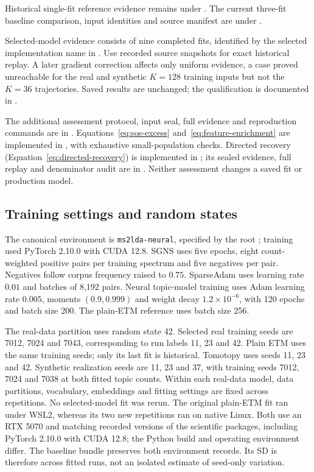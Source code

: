 \documentclass[10pt,a4paper]{article}
\begin{document}
Historical single-fit reference evidence remains under
.
The current three-fit baseline comparison, input identities and source
manifest are under .

Selected-model evidence consists of nine completed fits, identified by the
selected implementation name in
.
Use recorded source snapshots for exact historical replay. A later gradient
correction affects only uniform evidence, a case proved unreachable for the
real and synthetic $K=128$ training inputs but not the $K=36$ trajectories.
Saved results are unchanged; the qualification is documented in
.

The additional assessment protocol, input seal, full evidence and reproduction
commands are in .
Equations~\ref{eq:sos-excess} and~\ref{eq:feature-enrichment} are implemented
in , with exhaustive
small-population checks.
Directed recovery (Equation~\ref{eq:directed-recovery}) is implemented in
; its sealed evidence,
full replay and denominator audit are in
. Neither assessment changes
a saved fit or production model.

\subsection{Training settings and random states}
\label{app:recipe}
The canonical environment is \texttt{ms2lda-neural}, specified by the root
; training used PyTorch 2.10.0 with CUDA 12.8.
SGNS uses five epochs, eight count-weighted positive pairs per training
spectrum and five negatives per pair. Negatives follow corpus frequency
raised to $0.75$. SparseAdam uses learning rate $0.01$ and batches of 8,192
pairs. Neural topic-model training uses Adam learning rate $0.005$, moments
$(0.9,0.999)$ and weight decay $1.2\times10^{-6}$, with 120 epochs and batch
size 200. The plain-ETM reference uses batch size 256.

The real-data partition uses random state 42. Selected real training seeds
are 7012, 7024 and 7043, corresponding to run labels 11, 23 and 42.
Plain ETM uses the same training seeds; only its last fit is historical.
Tomotopy uses seeds 11, 23 and 42. Synthetic realization seeds are 11, 23
and 37, with training seeds 7012, 7024 and 7038 at both fitted topic counts.
Within each real-data model, data partitions, vocabulary, embeddings and fitting
settings are fixed across repetitions. No selected-model fit was rerun.
The original plain-ETM fit ran under WSL2, whereas its two new repetitions
ran on native Linux. Both use an RTX 5070 and matching recorded versions of
the scientific packages, including PyTorch 2.10.0 with CUDA 12.8; the Python
build and operating environment differ. The baseline bundle preserves both
environment records. Its SD is therefore across fitted runs, not an isolated
estimate of seed-only variation.
\end{document}
